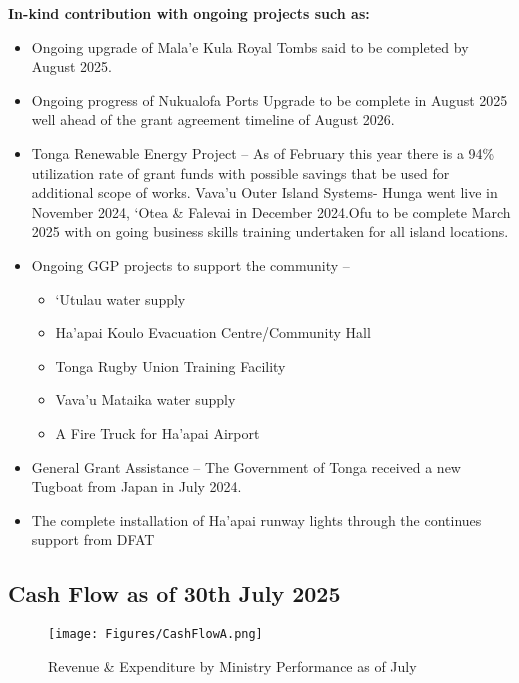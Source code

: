 \documentclass[11pt,a4paper]{setup}
\begin{document}
\newpage

\begin{center}
\textbf{In-kind contribution with ongoing projects such as:}
\end{center}

\begin{itemize}
    \item Ongoing upgrade of Mala’e Kula Royal Tombs said to be completed by August 2025.
    \item Ongoing progress of Nukualofa Ports Upgrade to be complete in August 2025 well ahead of the grant agreement timeline of August 2026.
    \item Tonga Renewable Energy Project – As of February this year there is a 94\% utilization rate of grant funds with possible savings that be used for additional scope of works. Vava’u Outer Island Systems- Hunga went live in November 2024, ‘Otea \& Falevai in December 2024.Ofu to be complete March 2025 with on going business skills training undertaken for all island locations.
    \item Ongoing GGP projects to support the community – 
    \begin{itemize}
        \item ‘Utulau water supply
        \item Ha’apai Koulo Evacuation Centre/Community Hall
        \item Tonga Rugby Union Training Facility
        \item Vava’u Mataika water supply
        \item A Fire Truck for Ha'apai Airport
    \end{itemize}

    \item General Grant Assistance – The Government of Tonga received a new Tugboat from Japan in July 2024.
    \item The complete installation of Ha’apai runway lights through the continues support from DFAT
\end{itemize}

\subsection*{Cash Flow as of 30th July 2025}
\begin{figure}[H]
    		\centering
    		\texttt{[image: Figures/CashFlowA.png]}
    		\caption{Revenue \& Expenditure by Ministry Performance as of July}
    		\label{fig:figure}
    	\end{figure}
\end{document}
